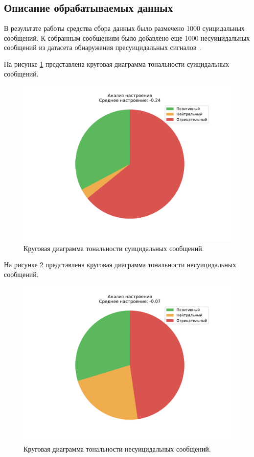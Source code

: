 \subsection{Описание обрабатываемых данных}

В результате работы средства сбора данных было размечено 1000 суицидальных сообщений. К собранным сообщениям было добавлено еще 1000 несуицидальных сообщений из датасета обнаружения пресуицидальных сигналов~\cite{dataset}. 

На рисунке \ref{img:sentiments1} представлена круговая диаграмма тональности суицидальных сообщений.

\begin{figure}[H]
	\centering
	\includegraphics[width=\textwidth]{inc/plots/sentiments_suicidal.pdf}
	\caption{ Круговая диаграмма тональности суицидальных сообщений. }
	\label{img:sentiments1}
\end{figure}

На рисунке \ref{img:sentiments2} представлена круговая диаграмма тональности несуицидальных сообщений.

\begin{figure}[H]
	\centering
	\includegraphics[width=\textwidth]{inc/plots/sentiments_non_suicidal.pdf}
	\caption{ Круговая диаграмма тональности несуицидальных сообщений. }
	\label{img:sentiments2}
\end{figure}


